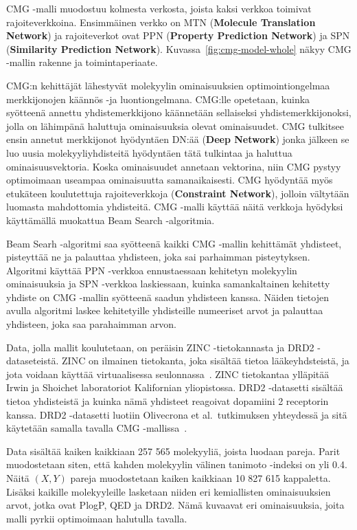 \documentclass[finnish,twoside,censored,tkt,sw-line]{HYthesisML}
\begin{document}
CMG -malli muodostuu kolmesta verkosta, joista kaksi verkkoa toimivat rajoiteverkkoina.
Ensimmäinen verkko on MTN (\textbf{Molecule Translation Network}) ja rajoiteverkot ovat PPN (\textbf{Property Prediction Network}) ja SPN (\textbf{Similarity Prediction Network}).
Kuvassa~\ref{fig:cmg-model-whole} näkyy CMG -mallin rakenne ja toimintaperiaate.

CMG:n kehittäjät lähestyvät molekyylin ominaisuuksien optimointiongelmaa merkkijonojen käännös -ja luontiongelmana.
CMG:lle opetetaan, kuinka syötteenä annettu yhdistemerkkijono käännetään sellaiseksi yhdistemerkkijonoksi, jolla on lähimpänä haluttuja ominaisuuksia olevat ominaisuudet.
CMG tulkitsee ensin annetut merkkijonot hyödyntäen DN:ää (\textbf{Deep Network}) jonka jälkeen se luo uusia molekyyliyhdisteitä hyödyntäen tätä tulkintaa ja haluttua ominaisuusvektoria.
Koska ominaisuudet annetaan vektorina, niin CMG pystyy optimoimaan useampaa ominaisuutta samanaikaisesti.
CMG hyödyntää myös etukäteen koulutettuja rajoiteverkkoja (\textbf{Constraint Network}), jolloin vältytään luomasta mahdottomia yhdisteitä.
CMG -malli käyttää näitä verkkoja hyödyksi käyttämällä muokattua Beam Search -algoritmia.

Beam Searh -algoritmi saa syötteenä kaikki CMG -mallin kehittämät yhdisteet, pisteyttää ne ja palauttaa yhdisteen, joka sai parhaimman pisteytyksen.
Algoritmi käyttää PPN -verkkoa ennustaessaan kehitetyn molekyylin ominaisuuksia ja SPN -verkkoa laskiessaan, kuinka samankaltainen kehitetty yhdiste on CMG -mallin syötteenä saadun yhdisteen kanssa.
Näiden tietojen avulla algoritmi laskee kehitetyille yhdisteille numeeriset arvot ja palauttaa yhdisteen, joka saa parahaimman arvon.

Data, jolla mallit koulutetaan, on peräisin ZINC -tietokannasta ja DRD2 -dataseteistä.
ZINC on ilmainen tietokanta, joka sisältää tietoa lääkeyhdsteistä, ja jota voidaan käyttää virtuaalisessa seulonnassa~\cite{ZINC}.
ZINC tietokantaa ylläpitää Irwin ja Shoichet laboratoriot Kalifornian yliopistossa.
DRD2 -datasetti sisältää tietoa yhdisteistä ja kuinka nämä yhdisteet reagoivat dopamiini 2 receptorin kanssa.
DRD2 -datasetti luotiin Olivecrona et al.\ tutkimuksen yhteydessä ja sitä käytetään samalla tavalla CMG -mallissa~\cite{ShinBonggun}.

Data sisältää kaiken kaikkiaan 257 565 molekyyliä, joista luodaan pareja.
Parit muodostetaan siten, että kahden molekyylin välinen tanimoto -indeksi on yli 0.4.
Näitä \((X,Y)\) pareja muodostetaan kaiken kaikkiaan 10 827 615 kappaletta.
Lisäksi kaikille molekyyleille lasketaan niiden eri kemiallisten ominaisuuksien arvot, jotka ovat PlogP, QED ja DRD2.
Nämä kuvaavat eri ominaisuuksia, joita malli pyrkii optimoimaan halutulla tavalla.
\end{document}
